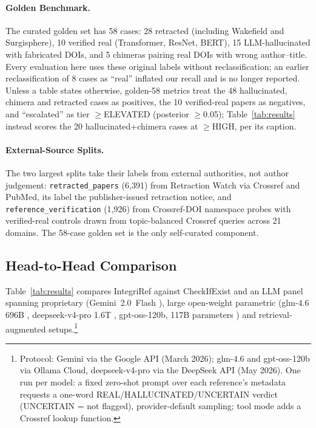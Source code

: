 \documentclass[letterpaper]{article} %
\begin{document}
\paragraph{Golden Benchmark.}
The curated golden set has 58 cases: 28 retracted (including Wakefield and Surgisphere), 10 verified real (Transformer, ResNet, BERT), 15 LLM-hallucinated with fabricated DOIs, and 5 chimeras pairing real DOIs with wrong author--title. Every evaluation here uses these original labels without reclassification; an earlier reclassification of 8 cases as ``real'' inflated our recall and is no longer reported. Unless a table states otherwise, golden-58 metrics treat the 48 hallucinated, chimera and retracted cases as positives, the 10 verified-real papers as negatives, and ``escalated'' as tier $\geq$ELEVATED (posterior $\geq$0.05); Table~\ref{tab:results} instead scores the 20 hallucinated+chimera cases at $\geq$HIGH, per its caption.

\paragraph{External-Source Splits.}
\label{par:external}
The two largest splits take their labels from external authorities, not author judgement: \texttt{retracted\_papers} (6{,}391) from Retraction Watch via Crossref and PubMed, its label the publisher-issued retraction notice, and \texttt{reference\_verification} (1{,}926) from Crossref-DOI namespace probes with verified-real controls drawn from topic-balanced Crossref queries across 21 domains. The 58-case golden set is the only self-curated component.

\subsection{Head-to-Head Comparison}

Table~\ref{tab:results} compares IntegriRef against CheckIfExist \cite{abbonato2026checkifexist} and an LLM panel spanning proprietary (Gemini~2.0~Flash \cite{google2024gemini2}), large open-weight parametric (glm-4.6 696B \cite{glm2025arc}, deepseek-v4-pro 1.6T \cite{deepseek2026v4pro}, gpt-oss-120b, 117B parameters \cite{openai2025gptoss}) and retrieval-augmented setups.\footnote{Protocol: Gemini via the Google API (March 2026); glm-4.6 and gpt-oss-120b via Ollama Cloud, deepseek-v4-pro via the DeepSeek API (May 2026). One run per model: a fixed zero-shot prompt over each reference's metadata requests a one-word REAL/HALLUCINATED/UNCERTAIN verdict (UNCERTAIN = not flagged), provider-default sampling; tool mode adds a Crossref lookup function.}
\end{document}

